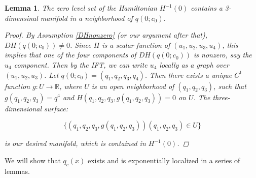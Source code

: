 \documentclass[12pt]{article}
\def\R{{\mathbb R}}
\newtheorem{lemma}{Lemma}
\begin{document}
\begin{lemma}The zero level set of the Hamiltonian $H^{-1}(0)$ contains a 3-dimensinal manifold in a neighborhood of $q(0; c_0)$.
\begin{proof}
By Assumption \ref{DHnonzero} (or our argument after that), $DH(q(0; c_0)) \neq 0$. Since $H$ is a scalar function of $(u_1, u_2, u_3, u_4)$, this implies that one of the four components of $DH(q(0; c_0))$ is nonzero, say the $u_4$ component. Then by the IFT, we can write $u_4$ locally as a graph over $(u_1, u_2, u_3)$. Let $q(0; c_0) = (q_1, q_2, q_3, q_4)$. Then there exists a unique $C^1$ function $g: U \rightarrow \R$, where $U$ is an open neighborhood of $(q_1, q_2, q_3)$, such that $g(q_1, q_2, q_3) = q^4$ and $H(q_1, q_2, q_3, g(q_1, q_2, q_3) ) = 0$ on $U$. The three-dimensional surface:

\[
\{ (q_1, q_2, q_3, g(q_1, q_2, q_3)) (q_1, q_2, q_3) \in U \}
\]

is our desired manifold, which is contained in $H^{-1}(0)$.

\end{proof}
\end{lemma}

We will show that $q_c(x)$ exists and is exponentially localized in a series of lemmas.\\
\end{document}
